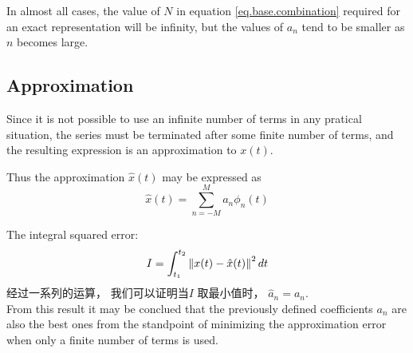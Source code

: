 \documentclass{article}
\begin{document}
In almost all cases, the value of $N$ in equation \eqref{eq.base.combination} required for an exact representation will be infinity,
but the values of $a_n$ tend to be smaller as $n$ becomes large. 

\subsection{Approximation}
Since it is not possible to use an infinite number of terms in any pratical situation, 
the series must be terminated after some finite number of terms, and the resulting expression is an approximation to $x(t)$. 

Thus the approximation $\hat{x}(t)$ may be expressed as
\begin{equation}
\hat{x}(t) = \sum_{n = -M}^M a_n \phi_n(t)
\end{equation}

The integral squared error:
$$
I = \int_{t_1}^{t_2} \left\Vert x(t) - \hat{x}(t)\right\Vert^2 dt
$$
经过一系列的运算， 我们可以证明当$I$ 取最小值时， $\hat{a}_n = a_n$.\\
From this result it may be conclued that the previously defined coefficients $a_n$ are also the best ones from the standpoint of minimizing the approximation error when only a finite number of terms is used.
\end{document}
